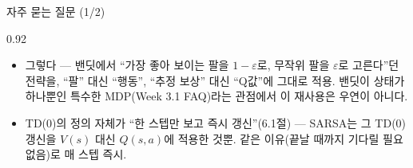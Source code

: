 \begin{frame}{자주 묻는 질문 (1/2)}
\begin{center}\begin{varwidth}{0.92\textwidth}
  \begin{itemize}
    \item {}
      그렇다 --- 밴딧에서 ``가장 좋아 보이는 팔을 $1-\varepsilon$로,
      무작위 팔을 $\varepsilon$로 고른다''던 전략을, ``팔'' 대신
      ``행동'', ``추정 보상'' 대신 ``Q값''에 그대로 적용.
      밴딧이 상태가 하나뿐인 특수한 MDP(Week 3.1 FAQ)라는 관점에서
      이 재사용은 우연이 아니다.
    \item {}
      TD(0)의 정의 자체가 ``한 스텝만 보고 즉시 갱신''(6.1절) ---
      SARSA는 그 TD(0) 갱신을 $V(s)$ 대신 $Q(s,a)$에 적용한 것뿐.
      같은 이유(끝날 때까지 기다릴 필요 없음)로 매 스텝 즉시.
  \end{itemize}
\end{varwidth}\end{center}
\end{frame}
